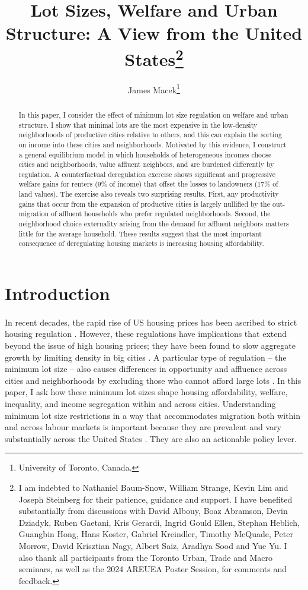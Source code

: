 \documentclass[12pt]{article}
\title{Lot Sizes, Welfare and Urban Structure: A View from the United States\footnote{\scriptsize I am indebted to Nathaniel Baum-Snow, William Strange, Kevin Lim and Joseph Steinberg for their patience, guidance and support. I have benefited substantially from discussions with David Albouy, Boaz Abramson, Devin Dziadyk, Ruben Gaetani, Kris Gerardi, Ingrid Gould Ellen, Stephan Heblich, Guangbin Hong, Hans Koster, Gabriel Kreindler, Timothy McQuade, Peter Morrow, David Krisztian Nagy, Albert Saiz, Aradhya Sood and Yue Yu. I also thank all participants from the Toronto Urban, Trade and Macro seminars, as well as the 2024 AREUEA Poster Session, for comments and feedback.}}
\author{James Macek\footnote{\scriptsize University of Toronto, Canada.}}
\begin{document}
\maketitle	
		
\begin{abstract}
	\footnotesize
In this paper, I consider the effect of minimum lot size regulation on welfare and urban structure. I show that minimal lots are the most expensive in the low-density neighborhoods of productive cities relative to others, and this can explain the sorting on income into these cities and neighborhoods. Motivated by this evidence, I construct a general equilibrium model in which households of heterogeneous incomes choose cities and neighborhoods, value affluent neighbors, and are burdened differently by regulation. A counterfactual deregulation exercise shows significant and progressive welfare gains for renters ($9 \%$ of income) that offset the losses to landowners ($17\%$ of land values). The exercise also reveals two surprising results. First, any productivity gains that occur from the expansion of productive cities is largely nullified by the out-migration of affluent households who prefer regulated neighborhoods. Second, the neighborhood choice externality arising from the demand for affluent neighbors matters little for the average household. These results suggest that the most important consequence of deregulating housing markets is increasing housing affordability. 


\end{abstract}	
	\newpage	
	\section{Introduction}
		
	\paragraph*{}
	
	In recent decades, the rapid rise of US housing prices has been ascribed to strict housing regulation \citep{molloynathansonpaciorek, superstarcities}. However, these regulations have implications that extend beyond the issue of high housing prices; they have been found to slow aggregate growth by limiting density in big cities \citep{hseihmoretti,durantonpugaurbgrowth}. A particular type of regulation -- the minimum lot size -- also causes differences in opportunity and affluence across cities and neighborhoods by excluding those who cannot afford large lots \citep{Song, kulka}. In this paper, I ask how these minimum lot sizes shape housing affordability, welfare, inequality, and income segregation within and across cities. Understanding minimum lot size restrictions in a way that accommodates migration both within and across labour markets is important because they are prevalent and vary substantially across the United States \citep{gyourko2021}. They are also an actionable policy lever. 
	
\end{document}
